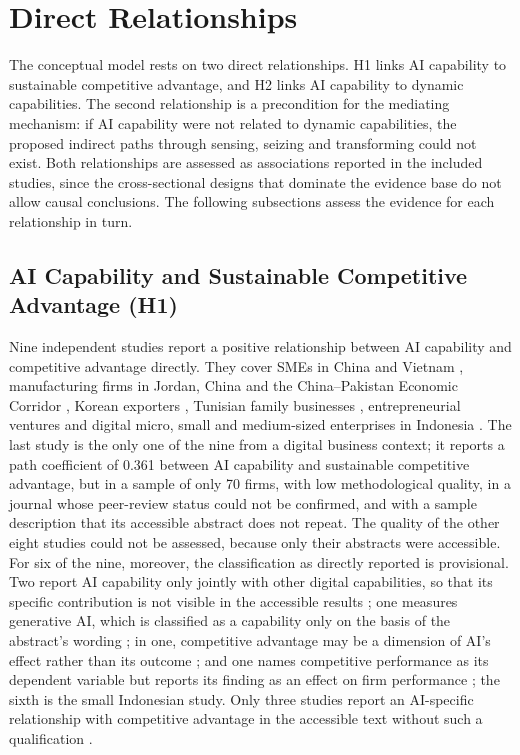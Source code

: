 \section{Direct Relationships}
\label{sec:direct}

The conceptual model rests on two direct relationships. H1 links AI capability to sustainable competitive advantage, and H2 links AI capability to dynamic capabilities. The second relationship is a precondition for the mediating mechanism: if AI capability were not related to dynamic capabilities, the proposed indirect paths through sensing, seizing and transforming could not exist. Both relationships are assessed as associations reported in the included studies, since the cross-sectional designs that dominate the evidence base do not allow causal conclusions. The following subsections assess the evidence for each relationship in turn.

\subsection{AI Capability and Sustainable Competitive Advantage (H1)}
\label{sec:h1}

Nine independent studies report a positive relationship between AI capability and competitive advantage directly. They cover SMEs in China \parencite{shao2026} and Vietnam \parencite{giang2026}, manufacturing firms in Jordan, China and the China--Pakistan Economic Corridor \parencite{almereb2026, tu2026, waqas2024}, Korean exporters \parencite{kim2026}, Tunisian family businesses \parencite{gafsi2026}, entrepreneurial ventures \parencite{almamary2025} and digital micro, small and medium-sized enterprises in Indonesia \parencite{firmansyah2025}. The last study is the only one of the nine from a digital business context; it reports a path coefficient of 0.361 between AI capability and sustainable competitive advantage, but in a sample of only 70 firms, with low methodological quality, in a journal whose peer-review status could not be confirmed, and with a sample description that its accessible abstract does not repeat. The quality of the other eight studies could not be assessed, because only their abstracts were accessible. For six of the nine, moreover, the classification as directly reported is provisional. Two report AI capability only jointly with other digital capabilities, so that its specific contribution is not visible in the accessible results \parencite{giang2026, waqas2024}; one measures generative AI, which is classified as a capability only on the basis of the abstract's wording \parencite{almereb2026}; in one, competitive advantage may be a dimension of AI's effect rather than its outcome \parencite{almamary2025}; and one names competitive performance as its dependent variable but reports its finding as an effect on firm performance \parencite{gafsi2026}; the sixth is the small Indonesian study. Only three studies report an AI-specific relationship with competitive advantage in the accessible text without such a qualification \parencite{shao2026, kim2026, tu2026}.

